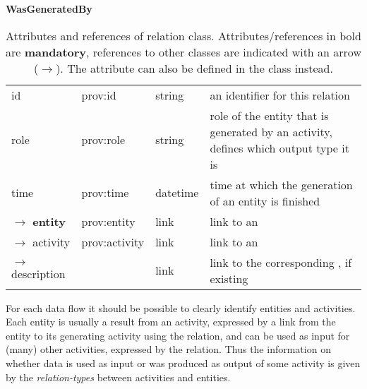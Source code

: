 \begin{table}[ht]
\small
{}\textwidth
\textbf{\normalsize WasGeneratedBy}\vspace{0.25em}\\
\begin{tabulary}{1.0\textwidth}{@{}lp{2.5cm}p{2cm}L@{}}
\toprule
{} &  &  & \\
\midrule
id & prov:id  & string & an identifier for this relation\\
role & prov:role & string   & role of the entity that is generated by an activity, defines which output type it is\\
time & prov:time & datetime & time at which the generation of an entity is finished\\
\midrule
$\rightarrow$ \textbf{entity} & prov:entity & link & link to an \\
$\rightarrow$ activity & prov:activity & link & link to an \\
$\rightarrow$ description  &  & link & link to the corresponding , if existing\\
\bottomrule
\end{tabulary}
\caption[Attributes and references of  relation class]{Attributes and references of  relation class. Attributes/references in bold are \textbf{mandatory}, references to other classes are indicated with an arrow ($\rightarrow$). The  attribute can also be defined in the  class instead.}
\label{tab:wasGeneratedBy}
\end{table}

For each data flow it should be possible to clearly identify entities and 
activities. 
Each entity is usually a result from an activity, expressed by a link from 
the entity to its generating activity using the  relation,
and can be used as input for (many) other activities, expressed by the  relation.
Thus the information on whether data is used as input or was produced as output of 
some activity is given by the \emph{relation-types} between activities and entities.

